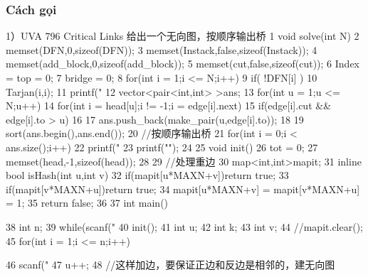 \documentclass[11pt]{article}
\begin{document}
\subsubsection{Cách gọi}

\begin{Code}
     1）UVA 796 Critical Links 给出一个无向图，按顺序输出桥
 1   void solve(int N){
 2       memset(DFN,0,sizeof(DFN));
 3       memset(Instack,false,sizeof(Instack));
 4       memset(add_block,0,sizeof(add_block));
 5       memset(cut,false,sizeof(cut));
 6       Index = top = 0;
 7       bridge = 0;
 8       for(int i = 1;i <= N;i++)
 9           if( !DFN[i] )
10                Tarjan(i,i);
11       printf("%
12       vector<pair<int,int> >ans;
13       for(int u = 1;u <= N;u++)
14           for(int i = head[u];i != -1;i = edge[i].next)
15                if(edge[i].cut && edge[i].to > u)
16                {
17                    ans.push_back(make_pair(u,edge[i].to));
18                }
19       sort(ans.begin(),ans.end());
20       //按顺序输出桥
21       for(int i = 0;i < ans.size();i++)
22           printf("%
23       printf("\n");
24   }
25   void init(){
26       tot = 0;
27       memset(head,-1,sizeof(head));
28   }
29   //处理重边
30   map<int,int>mapit;
31   inline bool isHash(int u,int v){
32       if(mapit[u*MAXN+v])return true;
33       if(mapit[v*MAXN+u])return true;
34       mapit[u*MAXN+v] = mapit[v*MAXN+u] = 1;
35       return false;
36   }
37   int main(){
38       int n;
39       while(scanf("%
40           init();
41           int u;
42           int k;
43           int v;
44           //mapit.clear();
45           for(int i = 1;i <= n;i++){
46                scanf("%
47                u++;
48                //这样加边，要保证正边和反边是相邻的，建无向图


}}
\end{Code}
\end{document}
